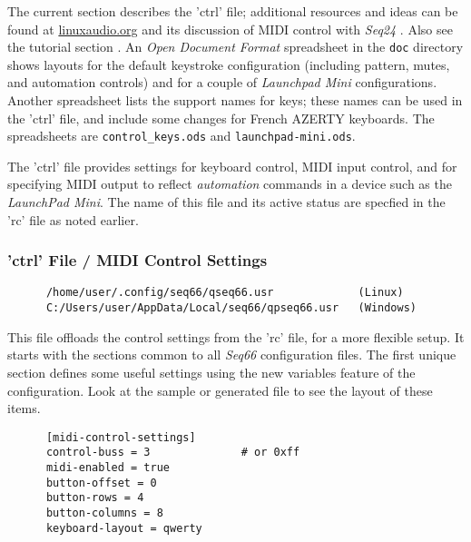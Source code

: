    The current section describes the 'ctrl' file;
   additional resources and ideas can be found at \url{linuxaudio.org} and
   its discussion of MIDI control with \textsl{Seq24} \cite{midicontrol}.
   Also see the tutorial section .
   An \textsl{Open Document Format} spreadsheet in the
   \texttt{doc} directory shows layouts for the default
   keystroke configuration (including pattern, mutes, and automation controls)
   and for a couple of \textsl{Launchpad Mini} configurations.
   Another spreadsheet lists the support names for keys; these names can be used
   in the 'ctrl' file, and include some changes for French AZERTY keyboards.
   The spreadsheets are
   \texttt{control\_keys.ods} and
   \texttt{launchpad-mini.ods}.

   The 'ctrl' file provides settings for keyboard control, MIDI input
   control, and
   for specifying MIDI output to reflect \textsl{automation} commands in a
   device such as the \textsl{LaunchPad Mini}.  The name of this file and its
   active status are specfied in the 'rc' file as noted earlier.

\subsubsection{'ctrl' File / MIDI Control Settings}
\label{subsubsec:configuration_ctrl_midi_control_settings}

   \begin{verbatim}
      /home/user/.config/seq66/qseq66.usr             (Linux)
      C:/Users/user/AppData/Local/seq66/qpseq66.usr   (Windows)
   \end{verbatim}

   This file offloads the control settings from the 'rc' file, for a more
   flexible setup. It starts with the sections common to all \textsl{Seq66}
   configuration files.  The first unique section defines some useful settings
   using the new variables feature of the configuration.  Look at the sample or
   generated file to see the layout of these items.

   \begin{verbatim}
      [midi-control-settings]
      control-buss = 3              # or 0xff
      midi-enabled = true
      button-offset = 0
      button-rows = 4
      button-columns = 8
      keyboard-layout = qwerty
   \end{verbatim}

